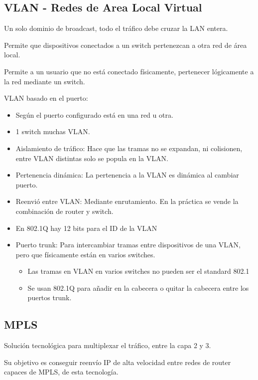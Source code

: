 \documentclass[12pt, twoside, openright]{report} %
\begin{document}
\subsection{VLAN - Redes de Area Local Virtual}
Un solo dominio de broadcast, todo el tráfico debe cruzar la LAN
entera.

Permite que dispositivos conectados a un switch pertenezcan a otra
red de área local.

Permite a un usuario que no está conectado físicamente, pertenecer
lógicamente a la red mediante un switch.
\pagebreak

VLAN basado en el puerto:

\begin{itemize}
	\item Según el puerto configurado está en una red u otra.
	\item 1 switch muchas VLAN.
	\item Aislamiento de tráfico: Hace que las tramas no se expandan, ni
	      colisionen, entre VLAN distintas solo se popula en la VLAN.
	\item Pertenencia dinámica: La pertenencia a la VLAN es dinámica al
	      cambiar puerto.
	\item Reenvió entre VLAN: Mediante enrutamiento. En la práctica se
	      vende la combinación de router y switch.
	\item En 802.1Q hay 12 bits para el ID de la VLAN
	\item Puerto trunk: Para intercambiar tramas entre dispositivos de una
	      VLAN, pero que físicamente están en varios switches.
	      \begin{itemize}
		      \item Las tramas en VLAN en varios switches no pueden ser el standard
		            802.1
		      \item Se usan 802.1Q para añadir en la cabecera o quitar la
		            cabecera entre los puertos trunk.
	      \end{itemize}
\end{itemize}


\subsection{MPLS}


Solución tecnológica para multiplexar el tráfico, entre la capa
2 y 3.

Su objetivo es conseguir reenvío IP de alta velocidad entre
redes de router capaces de MPLS, de esta tecnología.
\end{document}
